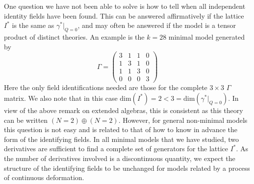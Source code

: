 \documentclass[a4paper,a4paper]{article}
\begin{document}
One question we have not been able to solve is how to tell when all independent identity fields have been found. This can be answered
affirmatively if the lattice $I^*$ is the same as $\gamma^*|_{Q=0}$, and may often be answered if the model is a tensor product of distinct theories. 
An example is the $k=28$ minimal model generated by 
\begin{displaymath}
\Gamma = \left( \begin{array}{cccc} 3 & 1 & 1 & 0 \\ 1 & 3 & 1 & 0 \\ 1 & 1 & 3 & 0 \\ 0 & 0 & 0 & 3 \end{array} \right)
\end{displaymath}
Here the only field identifications needed are those for the complete $3\times3$ $\Gamma$ matrix. We also note
that in this case $\textrm{dim}(I^*) = 2 < 3 = \textrm{dim}(\gamma^* | _{Q=0})$. In view of the above remark on
extended algebras, this is consistent as this theory can be written $(N=2) \oplus (N=2)$. However, for general non-minimal models this 
question is not easy and is related
to that of how to know in advance the form of the identifying fields. In all minimal models that we have studied,
two derivatives are sufficient to find a complete set of generators for the lattice $I^{*}$. As the number of derivatives involved 
is a discontinuous quantity, we expect the structure of the identifying fields to be unchanged for models related by a process 
of continuous deformation.
\end{document}
